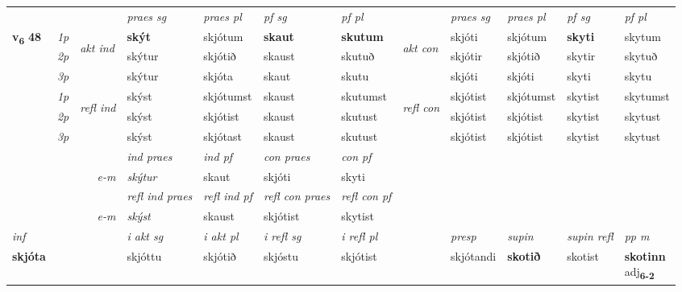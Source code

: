 \begin{longtable}[l]{X>{\footnotesize\itshape}llXXXXlXXXX}
\midrule

 & &   & \textit{praes sg}  & \textit{praes pl}    & \textit{ pf sg} & \textit{pf pl} & & \textit{praes sg}  & \textit{praes pl}    & \textit{pf sg} & \textit{pf pl }  \\ \cmidrule{4-7} \cmidrule{9-12}
 \multirow{2}{*}{{{\textbf{v{\textsubscript{6}}} \Large{\textbf{48}}}}}  & 1p & \multirow{3}{*}{\begin{turn}{90}\textit{akt ind}\end{turn}} & \textbf{skýt} & skjótum & \textbf{skaut} & \textbf{skutum} & \multirow{3}{*}{\begin{turn}{90}\textit{akt con}\end{turn}} &skjóti & skjótum & \textbf{skyti} & skytum\\*
 & 2p &  &  skýtur  & skjótið & skaust & skutuð & & skjótir & skjótið & skytir & skytuð \\*
 & 3p &  & skýtur & skjóta & skaut & skutu & & skjóti & skjóti& skyti & skytu \\*
\cmidrule{4-7} \cmidrule{9-12}
 & 1p & \multirow{3}{*}{\begin{turn}{90}\textit{refl ind}\end{turn}}  & skýst & skjótumst & skaust & skutumst & \multirow{3}{*}{\begin{turn}{90}\textit{refl con}\end{turn}}  &skjótist & skjótumst & skytist & skytumst \\*
 & 2p &  & skýst & skjótist & skaust & skutust & &skjótist & skjótist & skytist & skytust \\*
 & 3p  & & skýst & skjótast & skaust & skutust & & skjótist & skjótist& skytist & skytust \\*
\cmidrule{4-7} \cmidrule{9-12}

   && &  \textit{ind praes} & \textit{ind pf} & \textit{con praes} & \textit{con pf} \\*
\multicolumn{3}{r}{\textit{e-m}} & skýtur & skaut & skjóti & skyti \\*

\cmidrule{4-7}
 & && \textit{refl ind praes} & \textit{refl ind pf} & \textit{refl con praes} & \textit{refl con pf} \\*
\multicolumn{3}{r}{\textit{e-m}}& skýst & skaust & skjótist & skytist \\*

\cmidrule{4-7}
   {\textit{inf}} & &  & \textit{i akt sg} & \textit{i akt pl} & \textit{i refl sg} & \textit{i refl pl} && \textit{presp} & \textit{supin} & \textit{supin refl} & \textit{pp m} \\*
  {\textbf{skjóta}} & && skjóttu  & skjótið & skjóstu & skjótist && skjótandi &  \textbf{skotið} & skotist & \specialcell{\textbf{skotinn} \\ adj\textbf{\textsubscript{6-2}}} \\*


\end{longtable}
